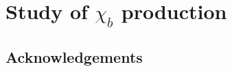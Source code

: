 \documentclass[12pt,a4paper]{report}
\begin{document}
\chapter{Study of $\chi_{b}$ production}










\section*{Acknowledgements}

\renewcommand{\bibname}{References}%



\end{document}
